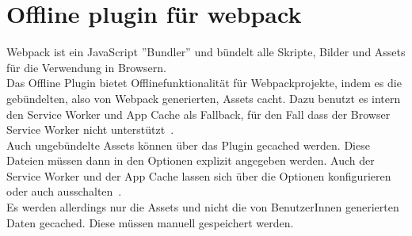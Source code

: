 \section{Offline plugin für webpack}
Webpack ist ein JavaScript ''Bundler'' und bündelt alle Skripte, Bilder und \gls{Assets} für die Verwendung in Browsern.\\
Das Offline Plugin bietet Offlinefunktionalität für Webpackprojekte, indem es die gebündelten, also von Webpack generierten, \gls{Assets} cacht.
Dazu benutzt es intern den Service Worker und App Cache als Fallback, für den Fall dass der Browser Service Worker nicht unterstützt~\cite{webpack-gh}.\\
Auch ungebündelte \gls{Assets} können über das Plugin gecached werden. Diese Dateien müssen dann in den Optionen explizit angegeben werden.
Auch der Service Worker und der App Cache lassen sich über die Optionen konfigurieren oder auch ausschalten~\cite{webpack-opt}.\\
Es werden allerdings nur die \gls{Assets} und nicht die von BenutzerInnen generierten Daten gecached. Diese müssen manuell gespeichert werden.